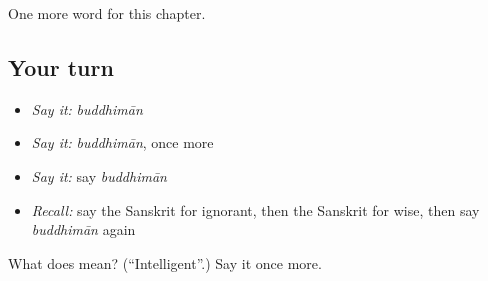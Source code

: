 \begin{grammarlens}[title={What you've built}]
One more word for this chapter.
\end{grammarlens}

\subsection*{Your turn}
\begin{itemize}
\raggedright
  \item \emph{Say it:} \emph{buddhimān}
  \item \emph{Say it:} \emph{buddhimān}, once more
  \item \emph{Say it:} say \emph{buddhimān}
  \item \emph{Recall:} say the Sanskrit for ignorant, then the Sanskrit for wise, then say \emph{buddhimān} again
\end{itemize}

\begin{tcolorbox}[breakable,colback=teal!4,colframe=teal!35!black,title={Before you move on}]
What does  mean? (\textquotedblleft{}Intelligent\textquotedblright{}.) Say it once more.
\end{tcolorbox}
